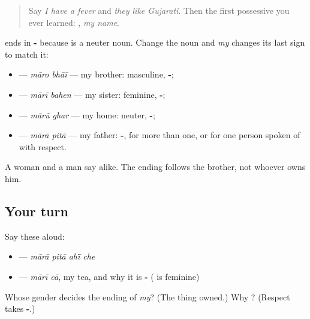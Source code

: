 \label{lesson:GU-C146-maaro}



\begin{quote}
Say \emph{I have a fever} and \emph{they like Gujarati}. Then the first possessive you ever learned: \textbf{ }, \emph{my name}.
\end{quote}

\begin{grammarlens}[title={Grammar Lens: the ending follows the thing}]
\textbf{} ends in \textbf{-} because \textbf{} is a neuter noun. Change the noun and \emph{my} changes its last sign to match it:

\begin{itemize}
\raggedright
  \item \textbf{ } — \emph{māro bhāī} — my brother: masculine, \textbf{-};
  \item \textbf{ } — \emph{mārī bahen} — my sister: feminine, \textbf{-};
  \item \textbf{ } — \emph{mārũ ghar} — my home: neuter, \textbf{-};
  \item \textbf{ } — \emph{mārā pitā} — my father: \textbf{-}, for more than one, or for one person spoken of with respect.
\end{itemize}

A woman and a man say \textbf{ } alike. The ending follows the brother, not whoever owns him.
\end{grammarlens}

\subsection*{Your turn}
Say these aloud:

\begin{itemize}
\raggedright
  \item \textbf{   } — \emph{mārā pitā ahī̃ che}
  \item \textbf{ } — \emph{mārī cā}, my tea, and why it is \textbf{-} (\textbf{} is feminine)
\end{itemize}

\begin{tcolorbox}[breakable,colback=teal!4,colframe=teal!35!black,title={Before you move on}]
Whose gender decides the ending of \emph{my}? (The thing owned.) Why \textbf{ }? (Respect takes \textbf{-}.)
\end{tcolorbox}
